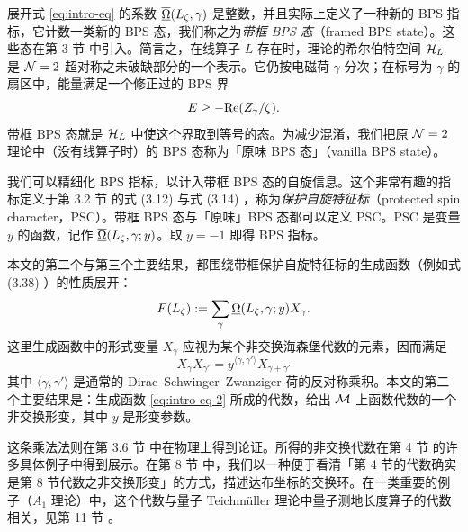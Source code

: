 展开式 \eqref{eq:intro-eq} 的系数 $\overline{\underline{\Omega}}(L_\zeta,\gamma)$ 是整数，并且实际上定义了一种新的 BPS 指标，它计数一类新的 BPS 态，我们称之为\emph{带框 BPS 态}（framed BPS state）。这些态在第 3 节%
中引入。简言之，在线算子 $L$ 存在时，理论的希尔伯特空间 $\mathcal{H}_L$ 是 $\mathcal{N}=2$ 超对称之未破缺部分的一个表示。它仍按电磁荷 $\gamma$ 分次；在标号为 $\gamma$ 的扇区中，能量满足一个修正过的 BPS 界
\begin{equation} \label{eq:bps-bound}
E\geq - {\rm Re} (Z_\gamma/\zeta).
\end{equation}
带框 BPS 态就是 $\mathcal{H}_L$ 中使这个界取到等号的态。为减少混淆，我们把原 $\mathcal{N}=2$ 理论中（没有线算子时）的 BPS 态称为「原味 BPS 态」（vanilla BPS state）。

我们可以精细化 BPS 指标，以计入带框 BPS 态的自旋信息。这个非常有趣的指标定义于第 3.2 节%
的式 (3.12) 与式 (3.14)%
，称为\emph{保护自旋特征标}（protected spin character，PSC）。带框 BPS 态与「原味」BPS 态都可以定义 PSC。PSC 是变量 $y$ 的函数，记作 $\overline{\underline{\Omega}}(L_\zeta,\gamma;y)$。取 $y=-1$ 即得 BPS 指标。

本文的第二个与第三个主要结果，都围绕带框保护自旋特征标的生成函数（例如式 (3.38)%
）的性质展开：
\begin{equation}\label{eq:intro-eq-2}
F( L_\zeta ) := \sum_{\gamma} \overline{\underline{\Omega}}( L_\zeta, \gamma;y) X_\gamma.
\end{equation}
这里生成函数中的形式变量 $X_{\gamma}$ 应视为某个非交换海森堡代数的元素，因而满足
\begin{equation} \label{eq:heis}
X_{\gamma} X_{\gamma'} = y^{\langle \gamma, \gamma' \rangle} X_{\gamma+\gamma'}
\end{equation}
其中 $\langle \gamma, \gamma' \rangle$ 是通常的 Dirac--Schwinger--Zwanziger 荷的反对称乘积。本文的第二个主要结果是：生成函数 \eqref{eq:intro-eq-2} 所成的代数，给出 $\mathcal{M}$ 上函数代数的一个非交换形变，其中 $y$ 是形变参数。

这条乘法法则在第 3.6 节%
中在物理上得到论证。所得的非交换代数在第 4 节%
的许多具体例子中得到展示。在第 8 节%
中，我们以一种便于看清「第 4 节的代数确实是第 8 节代数之非交换形变」的方式，描述达布坐标的交换环。在一类重要的例子（$A_1$ 理论）中，这个代数与量子 Teichm\"uller 理论中量子测地长度算子的代数相关，见第 11 节%
。

